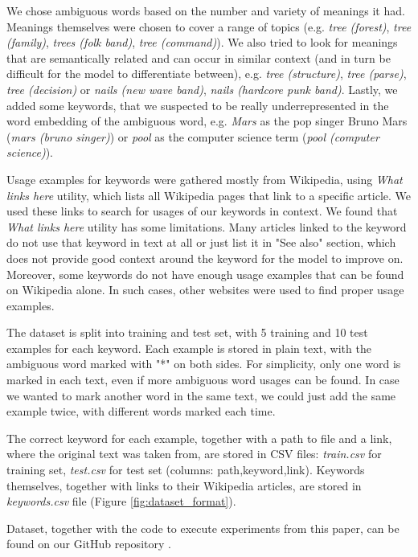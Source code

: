 \documentclass{llncs}
\begin{document}
We chose ambiguous words based on the number and variety of meanings it had.
Meanings themselves were chosen to cover a range of topics (e.g. \textit{tree (forest)}, \textit{tree (family)}, \textit{trees (folk band)}, \textit{tree (command)}).
We also tried to look for meanings that are semantically related and can occur in similar context (and in turn be difficult for the model to differentiate between), e.g. \textit{tree (structure)}, \textit{tree (parse)}, \textit{tree (decision)} or \textit{nails (new wave band)}, \textit{nails (hardcore punk band)}.
Lastly, we added some keywords, that we suspected to be really underrepresented in the word embedding of the ambiguous word, e.g. \textit{Mars} as the pop singer Bruno Mars (\textit{mars (bruno singer)}) or \textit{pool} as the computer science term (\textit{pool (computer science)}).

Usage examples for keywords were gathered mostly from Wikipedia, using \textit{What links here} utility, which lists all Wikipedia pages that link to a specific article.
We used these links to search for usages of our keywords in context.
We found that \textit{What links here} utility has some limitations.
Many articles linked to the keyword do not use that keyword in text at all or just list it in "See also" section, which does not provide good context around the keyword for the model to improve on.
Moreover, some keywords do not have enough usage examples that can be found on Wikipedia alone.
In such cases, other websites were used to find proper usage examples.

The dataset is split into training and test set, with 5 training and 10 test examples for each keyword.
Each example is stored in plain text, with the ambiguous word marked with "*" on both sides.
For simplicity, only one word is marked in each text, even if more ambiguous word usages can be found.
In case we wanted to mark another word in the same text, we could just add the same example twice, with different words marked each time.

The correct keyword for each example, together with a path to file and a link, where the original text was taken from, are stored in CSV files: \textit{train.csv} for training set, \textit{test.csv} for test set (columns: path,keyword,link).
Keywords themselves, together with links to their Wikipedia articles, are stored in \textit{keywords.csv} file (Figure \ref{fig:dataset_format}).

Dataset, together with the code to execute experiments from this paper, can be found on our GitHub repository \cite{repository}.
\end{document}
